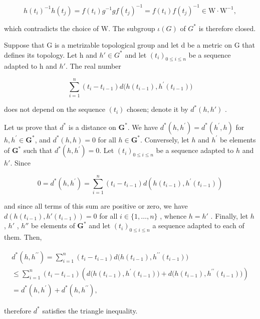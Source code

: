 \[
h (t _ {i}) ^ {- 1} h (t _ {j}) = f (t _ {i}) g ^ {- 1} g f (t _ {j}) ^ {- 1} = f (t _ {i}) f (t _ {j}) ^ {- 1} \in \mathrm{W} \cdot \mathrm{W} ^ {- 1},
\]

which contradicts the choice of W. The subgroup \(\iota(G)\) of \(G^{*}\) is therefore closed.

Suppose that G is a metrizable topological group and let d be a metric on G that defines its topology. Let h and \(h' \in G^{*}\) and let \((t_{i})_{0 \leqslant i \leqslant n}\) be a sequence adapted to h and \(h'\). The real number

\[
\sum_ {i = 1} ^ {n} (t _ {i} - t _ {i - 1}) d \bigl (h (t _ {i - 1}), h ^ {\prime} (t _ {i - 1}) \bigr)
\]

does not depend on the sequence \((t_{i})\) chosen; denote it by \(d^{*}(h,h')\) .

Let us prove that \(d^{*}\) is a distance on \(\mathbf{G}^{*}\). We have \(d^{*}(h,h^{\prime}) = d^{*}(h^{\prime},h)\) for \(h, h^{\prime} \in \mathbf{G}^{*}\), and \(d^{*}(h,h) = 0\) for all \(h \in \mathbf{G}^{*}\). Conversely, let \(h\) and \(h^{\prime}\) be elements of \(\mathbf{G}^{*}\) such that \(d^{*}(h,h^{\prime}) = 0\). Let \((t_{i})_{0\leqslant i\leqslant n}\) be a sequence adapted to \(h\) and \(h'\). Since

\[
0 = d ^ {*} (h, h ^ {\prime}) = \sum_ {i = 1} ^ {n} \left(t _ {i} - t _ {i - 1}\right) d \left(h \left(t _ {i - 1}\right), h ^ {\prime} \left(t _ {i - 1}\right)\right)
\]

and since all terms of this sum are positive or zero, we have \(d(h(t_{i-1}), h'(t_{i-1})) = 0\) for all \(i \in \{1, \ldots, n\}\) , whence \(h = h'\) . Finally, let \(h\) , \(h'\) , \(h''\) be elements of \(\mathbf{G}^*\) and let \((t_i)_{0 \leqslant i \leqslant n}\) a sequence adapted to each of them. Then,

\[
\begin{array}{l} d ^ {*} (h, h ^ {\prime \prime}) = \sum_ {i = 1} ^ {n} (t _ {i} - t _ {i - 1}) d \big (h (t _ {i - 1}), h ^ {\prime \prime} (t _ {i - 1}) \big) \\ \leqslant \sum_ {i = 1} ^ {n} (t _ {i} - t _ {i - 1}) \left(d \big (h (t _ {i - 1}), h ^ {\prime} (t _ {i - 1}) \big) + d \big (h (t _ {i - 1}), h ^ {\prime \prime} (t _ {i - 1}) \big)\right) \\ = d ^ {*} (h, h ^ {\prime}) + d ^ {*} (h, h ^ {\prime \prime}), \end{array}
\]

therefore \(d^{*}\) satisfies the triangle inequality.

